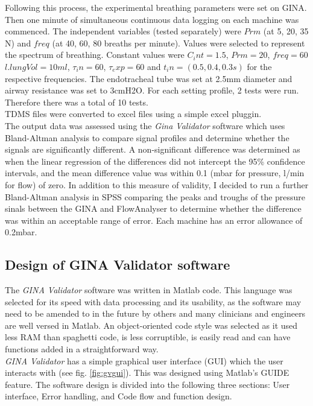 \documentclass[12pt, openany, oneside]{book}
\begin{document}
Following this process, the experimental breathing parameters were set on GINA. Then one minute of simultaneous continuous data logging on each machine was commenced. The independent variables (tested separately) were $Prm$ (at 5, 20, 35 N) and $freq$ (at 40, 60, 80 breaths per minute). Values were selected  to represent the spectrum of breathing. Constant values were $C_int = 1.5$, $Prm = 20$, $freq = 60$  $l.lungVol =10ml$, $\tau_in = 60$, $\tau_exp = 60$ and $t_in = (0.5, 0.4, 0.3 s)$ for the respective frequencies. The endotracheal tube was set at 2.5mm diameter and airway resistance was set to 3cmH2O. For each setting profile, 2 tests were run. Therefore there was a total of 10 tests.\\

TDMS files were converted to excel files using a simple excel pluggin.\\

The output data was assessed using the \textit{Gina Validator} software which uses Bland-Altman analysis to compare signal profiles and determine whether the signals are significantly different. A non-significant difference was determined as when the linear regression of the differences did not intercept the 95{\%} confidence intervals, and the mean difference value was within 0.1 (mbar for pressure, l/min for flow) of zero. In addition to this measure of validity, I decided to run a further Bland-Altman analysis in SPSS comparing the peaks and troughs of the pressure sinals between the GINA and FlowAnalyser to determine whether the difference was within an acceptable range of error. Each machine has an error allowance of 0.2mbar.


\subsection{Design of GINA Validator software}
The \textit{GINA Validator} software was written in Matlab code. This language was selected for its speed with data processing and its usability, as the software may need to be amended to in the future by others and many clinicians and engineers are well versed in Matlab. An object-oriented code style was selected as it used less RAM than spaghetti code, is less corruptible, is easily read and can have functions added in a straightforward way. \\

\textit{GINA Validator} has a simple graphical user interface (GUI) which the user interacts with (see fig. \ref{fig:gvgui}). This was designed using Matlab's GUIDE feature.  The software design is divided into the following three sections: User interface, Error handling, and Code flow and function design.
\end{document}
